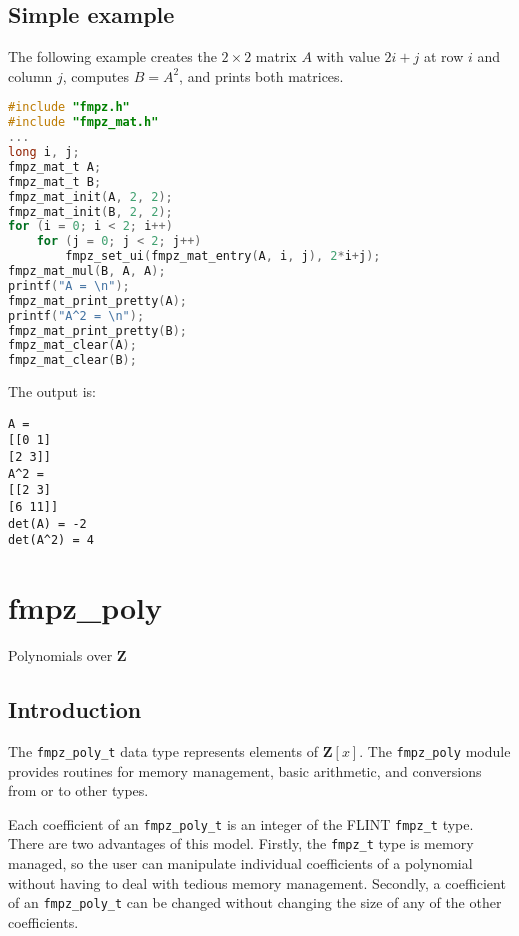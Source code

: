 \documentclass[a4paper,10pt]{book}
\newcommand{\Z}{\mathbf{Z}}%
\newcommand{\code}{\lstinline}
\begin{document}
\section{Simple example}
The following example creates the $2 \times 2$ matrix $A$ with
value $2i+j$ at row $i$ and column $j$, computes $B = A^2$,
and prints both matrices.

\begin{lstlisting}[language=c]
#include "fmpz.h"
#include "fmpz_mat.h"
...
long i, j;
fmpz_mat_t A;
fmpz_mat_t B;
fmpz_mat_init(A, 2, 2);
fmpz_mat_init(B, 2, 2);
for (i = 0; i < 2; i++)
    for (j = 0; j < 2; j++)
        fmpz_set_ui(fmpz_mat_entry(A, i, j), 2*i+j);
fmpz_mat_mul(B, A, A);
printf("A = \n");
fmpz_mat_print_pretty(A);
printf("A^2 = \n");
fmpz_mat_print_pretty(B);
fmpz_mat_clear(A);
fmpz_mat_clear(B);
\end{lstlisting}

The output is:
\begin{lstlisting}
A = 
[[0 1]
[2 3]]
A^2 = 
[[2 3]
[6 11]]
det(A) = -2
det(A^2) = 4

\end{lstlisting}





\chapter{fmpz\_poly}
\epigraph{Polynomials over $\Z$}{}

\section{Introduction}

The \code{fmpz_poly_t} data type represents elements of $\Z[x]$. The 
\code{fmpz_poly} module provides routines for memory management, basic 
arithmetic, and conversions from or to other types.

Each coefficient of an \code{fmpz_poly_t} is an integer of the FLINT 
\code{fmpz_t} type.  There are two advantages of this model.  Firstly, 
the \code{fmpz_t} type is memory managed, so the user can manipulate 
individual coefficients of a polynomial without having to deal with 
tedious memory management.  Secondly, a coefficient of an 
\code{fmpz_poly_t} can be changed without changing the size of any 
of the other coefficients.
\end{document}
